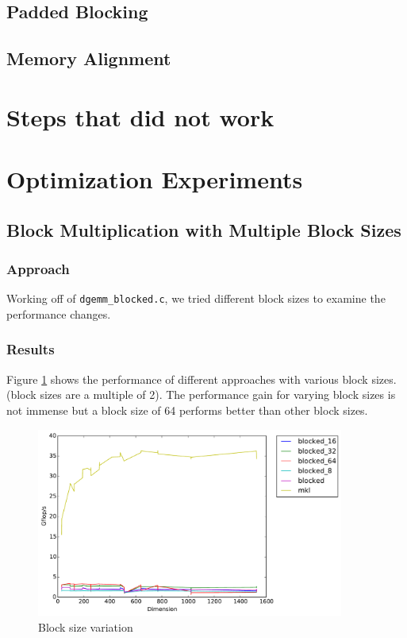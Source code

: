\documentclass[11pt]{article}
\begin{document}
\subsection{Padded Blocking}\label{sec:block}
\subsection{Memory Alignment}\label{sec:align}

\newpage
\section{Steps that did not work}

\newpage
\section{Optimization Experiments}
\subsection{Block Multiplication with Multiple Block Sizes}
\subsubsection{Approach}
Working off of \texttt{dgemm\_blocked.c}, we tried different block sizes to examine the performance changes. 
\subsubsection{Results}
Figure \ref{pow_2_blocks} shows the performance of different approaches with various block sizes. (block sizes are a multiple of 2). The performance gain for varying block sizes is not immense but a block size of 64 performs better than other block sizes. \\

\begin{figure}[H]
    \includegraphics[width=0.9\textwidth]{timing_block_size_changes.pdf}
    \caption{Block size variation}
    \label{pow_2_blocks}
\end{figure} 
\end{document}
